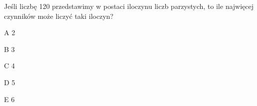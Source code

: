 \begin{tresc}
Jeśli liczbę 120 przedstawimy w postaci iloczynu liczb parzystych, to ile najwięcej czynników może liczyć taki iloczyn?
\end{tresc}
\begin{wariant}{A} 2 \end{wariant}
\begin{wariant}{B} 3 \end{wariant}
\begin{wariant}{C} 4 \end{wariant}
\begin{wariant}{D} 5 \end{wariant}
\begin{wariant}{E} 6 \end{wariant}
